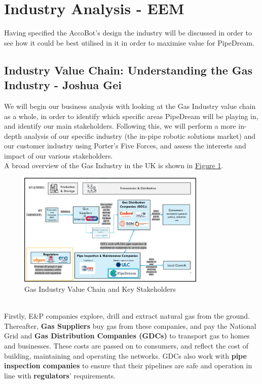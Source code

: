 \documentclass[11pt]{article}		%
\newcommand{\figref}[1]{\hyperref[#1]{Figure \ref*{#1}}}    %
\begin{document}
	\section{Industry Analysis - EEM}
		
	Having specified the AccoBot's design the industry will be discussed in order to see how it could be best utilised in it in order to maximise value for PipeDream.	
		
		\subsection[Industry Value Chain]{Industry Value Chain: Understanding the Gas Industry - Joshua Gei}
		We will begin our business analysis with looking at the Gas Industry value chain as a whole, in order to identify which specific areas PipeDream will be playing in, and identify our main stakeholders. Following this, we will perform a more in-depth analysis of our specific industry (the in-pipe robotic solutions market) and our customer industry using Porter’s Five Forces, and assess the interests and impact of our various stakeholders. 
        \\\hspace*{3ex}A broad overview of the Gas Industry in the UK is shown in \figref{Industry Value Chain}.
		\begin{figure}[h]
				\centering
				\includegraphics[width=0.8\textwidth]{industryvaluechain.jpg}
				\caption{Gas Industry Value Chain and Key Stakeholders}
				\label{Industry Value Chain}
			\end{figure}
		\\\hspace*{3ex}Firstly, E\&P companies explore, drill and extract natural gas from the ground. Thereafter, \textbf{Gas Suppliers} buy gas from these companies, and pay the National Grid and \textbf{Gas Distribution Companies (GDCs)} to transport gas to homes and businesses. These costs are passed on to consumers, and reflect the cost of building, maintaining and operating the networks. GDCs also work with \textbf{pipe inspection companies} to ensure that their pipelines are safe and operation in line with \textbf{regulators}’ requirements. 
\end{document}
